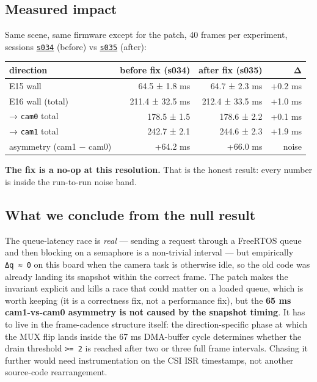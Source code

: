 \subsection{Measured impact}\label{measured-impact}

Same scene, same firmware except for the patch, 40 frames per
experiment, sessions
\href{../experiments/s034_e15_vs_e16_x40/}{\texttt{s034}} (before) vs
\href{../experiments/s035_e15_vs_e16_x40/}{\texttt{s035}} (after):

{\def\LTcaptype{none} %
\begin{longtable}[]{@{}lrrr@{}}
\toprule\noalign{}
direction & before fix (s034) & after fix (s035) & Δ \\
\midrule\noalign{}
\endhead
\bottomrule\noalign{}
\endlastfoot
E15 wall & 64.5 ± 1.8 ms & 64.7 ± 2.3 ms & +0.2 ms \\
E16 wall (total) & 211.4 ± 32.5 ms & 212.4 ± 33.5 ms & +1.0 ms \\
→ \texttt{cam0} total & 178.5 ± 1.5 & 178.6 ± 2.2 & +0.1 ms \\
→ \texttt{cam1} total & 242.7 ± 2.1 & 244.6 ± 2.3 & +1.9 ms \\
asymmetry (cam1 − cam0) & +64.2 ms & +66.0 ms & noise \\
\end{longtable}
}

\textbf{The fix is a no-op at this resolution.} That is the honest
result: every number is inside the run-to-run noise band.

\subsection{What we conclude from the null
result}\label{what-we-conclude-from-the-null-result}

The queue-latency race is \emph{real} --- sending a request through a
FreeRTOS queue and then blocking on a semaphore is a non-trivial
interval --- but empirically \texttt{Δq\ ≈\ 0} on this board when the
camera task is otherwise idle, so the old code was already landing its
snapshot within the correct frame. The patch makes the invariant
explicit and kills a race that could matter on a loaded queue, which is
worth keeping (it is a correctness fix, not a performance fix), but the
\textbf{65 ms cam1-vs-cam0 asymmetry is not caused by the snapshot
timing}. It has to live in the frame-cadence structure itself: the
direction-specific phase at which the MUX flip lands inside the 67 ms
DMA-buffer cycle determines whether the drain threshold
\texttt{\textgreater{}=\ 2} is reached after two or three full frame
intervals. Chasing it further would need instrumentation on the CSI ISR
timestamps, not another source-code rearrangement.

